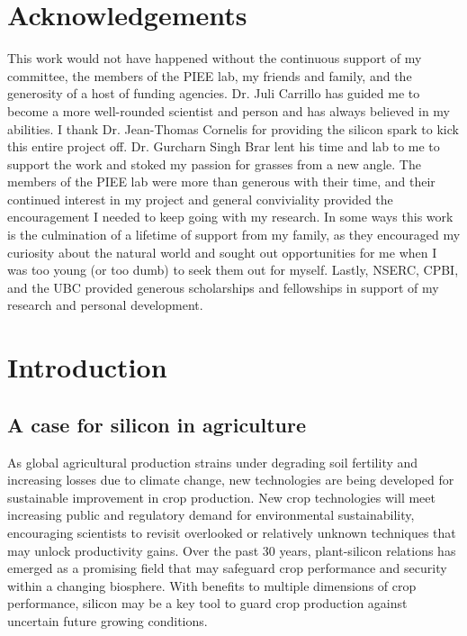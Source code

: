 \documentclass[12pt, letterpaper]{report}
\begin{document}
\newpage
\tableofcontents
\newpage
\listoftables
\newpage
\listoffigures

\chapter*{Acknowledgements}

This work would not have happened without the continuous support of my committee, the members of the PIEE lab, my friends and family, and the generosity of a host of funding agencies. Dr. Juli Carrillo has guided me to become a more well-rounded scientist and person and has always believed in my abilities. I thank Dr. Jean-Thomas Cornelis for providing the silicon spark to kick this entire project off. Dr. Gurcharn Singh Brar lent his time and lab to me to support the work and stoked my passion for grasses from a new angle. The members of the PIEE lab were more than generous with their time, and their continued interest in my project and general conviviality provided the encouragement I needed to keep going with my research. In some ways this work is the culmination of a lifetime of support from my family, as they encouraged my curiosity about the natural world and sought out opportunities for me when I was too young (or too dumb) to seek them out for myself. Lastly, NSERC, CPBI, and the UBC provided generous scholarships and fellowships in support of my research and personal development.

\chapter*{}


\chapter{Introduction}

\section{A case for silicon in agriculture}

As global agricultural production strains under degrading soil fertility and increasing losses due to climate change, new technologies are being developed for sustainable improvement in crop production. New crop technologies will meet increasing public and regulatory demand for environmental sustainability, encouraging scientists to revisit overlooked or relatively unknown techniques that may unlock productivity gains. Over the past 30 years, plant-silicon relations has emerged as a promising field that may safeguard crop performance and security within a changing biosphere. With benefits to multiple dimensions of crop performance, silicon may be a key tool to guard crop production against uncertain future growing conditions. 
\end{document}
